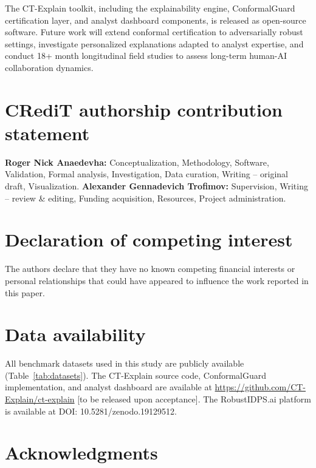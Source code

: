 \documentclass[preprint,review,12pt]{elsarticle}
\begin{document}
The CT-Explain toolkit, including the explainability engine, ConformalGuard certification layer, and analyst dashboard components, is released as open-source software. Future work will extend conformal certification to adversarially robust settings, investigate personalized explanations adapted to analyst expertise, and conduct 18+ month longitudinal field studies to assess long-term human-AI collaboration dynamics.


\section*{CRediT authorship contribution statement}

\textbf{Roger Nick Anaedevha:} Conceptualization, Methodology, Software, Validation, Formal analysis, Investigation, Data curation, Writing -- original draft, Visualization. \textbf{Alexander Gennadevich Trofimov:} Supervision, Writing -- review \& editing, Funding acquisition, Resources, Project administration.


\section*{Declaration of competing interest}

The authors declare that they have no known competing financial interests or personal relationships that could have appeared to influence the work reported in this paper.


\section*{Data availability}

All benchmark datasets used in this study are publicly available (Table~\ref{tab:datasets}). The CT-Explain source code, ConformalGuard implementation, and analyst dashboard are available at \url{https://github.com/CT-Explain/ct-explain} [to be released upon acceptance]. The RobustIDPS.ai platform is available at DOI: 10.5281/zenodo.19129512.


\section*{Acknowledgments}
\end{document}
